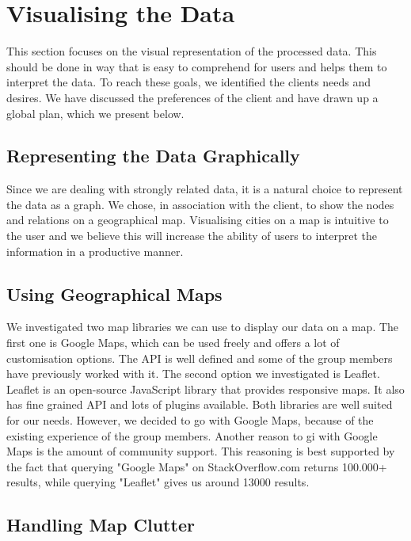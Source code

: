 \section{Visualising the Data}

This section focuses on the visual representation of the processed data. This should be done in way that is easy to comprehend for users and helps them to interpret the data. To reach these goals, we identified the clients needs and desires. We have discussed the preferences of the client and have drawn up a global plan, which we present below.

\subsection{Representing the Data Graphically}

Since we are dealing with strongly related data, it is a natural choice to represent the data as a graph. We chose, in association with the client, to show the nodes and relations on a geographical map. Visualising cities on a map is intuitive to the user and we believe this will increase the ability of users to interpret the information in a productive manner.

\subsection{Using Geographical Maps}

We investigated two map libraries we can use to display our data on a map. The first one is Google Maps, which can be used freely and offers a lot of customisation options. The API is well defined and some of the group members have previously worked with it. The second option we investigated is Leaflet. Leaflet is an open-source JavaScript library that provides responsive maps. It also has fine grained API and lots of plugins available.
Both libraries are well suited for our needs. However, we decided to go with Google Maps, because of the existing experience of the group members. Another reason to gi with Google Maps is the amount of community support. This reasoning is best supported by the fact that querying "Google Maps" on StackOverflow.com returns 100.000+ results, while querying "Leaflet" gives us around 13000 results.

\subsection{Handling Map Clutter}


